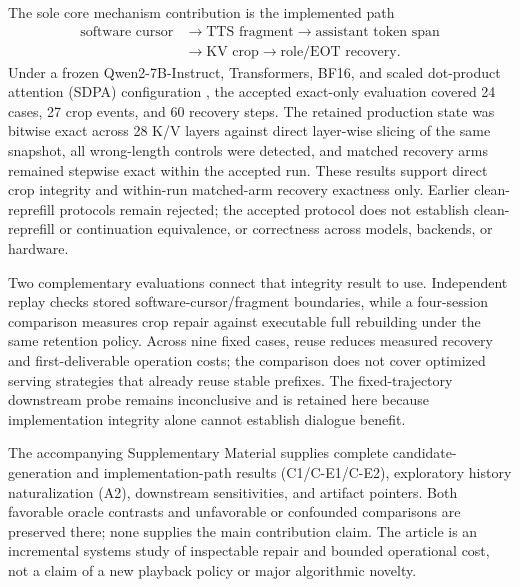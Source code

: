 The sole core mechanism contribution is the implemented path
\begin{equation}
\begin{split}
\text{software cursor}&\rightarrow\text{TTS fragment}\rightarrow
\text{assistant token span}\\
&\rightarrow\text{KV crop}\rightarrow\text{role/EOT recovery}.
\end{split}
\label{eq:contribution-path}
\end{equation}
Under a frozen Qwen2-7B-Instruct, Transformers, BF16, and scaled dot-product attention (SDPA) configuration \citep{yang2024Qwen2}, the accepted exact-only evaluation covered 24 cases, 27 crop events, and 60 recovery steps. The retained production state was bitwise exact across 28 K/V layers against direct layer-wise slicing of the same snapshot, all wrong-length controls were detected, and matched recovery arms remained stepwise exact within the accepted run. These results support direct crop integrity and within-run matched-arm recovery exactness only. Earlier clean-reprefill protocols remain rejected; the accepted protocol does not establish clean-reprefill or continuation equivalence, or correctness across models, backends, or hardware.

Two complementary evaluations connect that integrity result to use. Independent replay checks stored software-cursor/fragment boundaries, while a four-session comparison measures crop repair against executable full rebuilding under the same retention policy. Across nine fixed cases, reuse reduces measured recovery and first-deliverable operation costs; the comparison does not cover optimized serving strategies that already reuse stable prefixes. The fixed-trajectory downstream probe remains inconclusive and is retained here because implementation integrity alone cannot establish dialogue benefit.

The accompanying Supplementary Material supplies complete candidate-generation and implementation-path results (C1/C-E1/C-E2), exploratory history naturalization (A2), downstream sensitivities, and artifact pointers. Both favorable oracle contrasts and unfavorable or confounded comparisons are preserved there; none supplies the main contribution claim. The article is an incremental systems study of inspectable repair and bounded operational cost, not a claim of a new playback policy or major algorithmic novelty.
